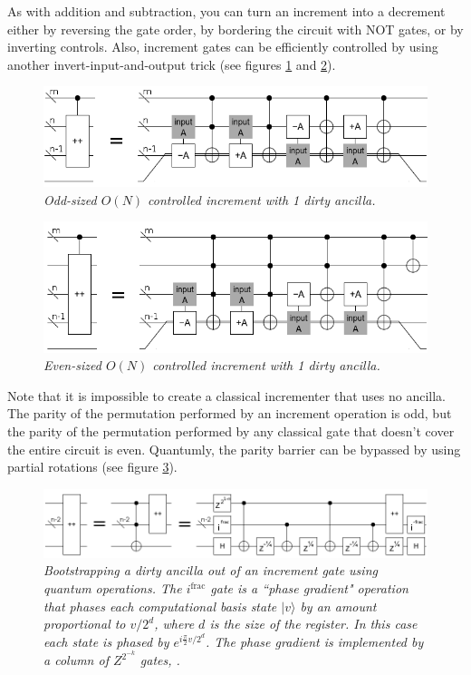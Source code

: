 \documentclass[twocolumn]{article}
\begin{document}
As with addition and subtraction, you can turn an increment into a decrement either by reversing the gate order, by bordering the circuit with NOT gates, or by inverting controls.
Also, increment gates can be efficiently controlled by using another invert-input-and-output trick (see figures \ref{fig:controlled-increment-odd} and \ref{fig:controlled-increment-even}).

\begin{figure}
  \centering
  \includegraphics[width=\linewidth]{assets/controlled-increment-odd.png}
  \caption{\em Odd-sized $O(N)$ controlled increment with 1 dirty ancilla.}
  \label{fig:controlled-increment-odd}
\end{figure}

\begin{figure}
  \centering
  \includegraphics[width=\linewidth]{assets/controlled-increment-even.png}
  \caption{\em Even-sized $O(N)$ controlled increment with 1 dirty ancilla.}
  \label{fig:controlled-increment-even}
\end{figure}

Note that it is impossible to create a classical incrementer that uses no ancilla.
The parity of the permutation performed by an increment operation is odd, but the parity of the permutation performed by any classical gate that doesn't cover the entire circuit is even.
Quantumly, the parity barrier can be bypassed by using partial rotations (see figure \ref{fig:bootstrap-ancilla}).

\begin{figure}
  \centering
  \includegraphics[width=\linewidth]{assets/ancilla-bootstrap.png}
  \caption{\em Bootstrapping a dirty ancilla out of an increment gate using quantum operations.
  The $i^{\text{frac}}$ gate is a ``phase gradient" operation that phases each computational basis state $|v\rangle$ by an amount proportional to $v/2^d$, where $d$ is the size of the register.
  In this case each state is phased by $e^{i \frac{\pi}{2} v/2^d}$.
  The phase gradient is implemented by a column of $Z^{2^{-k}}$ gates, .}
  \label{fig:bootstrap-ancilla}
\end{figure}
\end{document}
